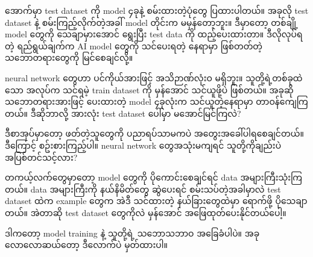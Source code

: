 အောက်မှာ test dataset ကို model ၄ခုနဲ့ စမ်းထားတဲ့ပုံတွေ ပြထားပါတယ်။
အခုလို test dataset နဲ့ စမ်းကြည့်လိုက်တဲ့အခါ် model တိုင်းက မမှန်တော့ဘူး။ ဒီမှာတော့ တစ်ချို့ model တွေကို
သေချာမှားအောင် ရွေးပြီး test data ကို ထည့်ပေးထားတာ။ ဒီလိုလုပ်ရတဲ့ ရည်ရွယ်ချက်က AI model တွေကို
သင်ပေးရတဲ့ နေရာမှာ ဖြစ်တတ်တဲ့ သဘောတရားတွေကို မြင်စေချင်လို့။

neural network တွေဟာ ပင်ကိုယ်အားဖြင့် အသိဉာဏ်လုံးဝ မရှိဘူး။ သူတို့ရဲ့တစ်ခုထဲသော အလုပ်က
သင်ရမဲ့ train dataset ကို မှန်အောင် သင်ယူဖို့ပဲ ဖြစ်တယ်။ အခုဆို သဘောတရားအားဖြင့် ပေးထားတဲ့ model 
၄ခုလုံးက သင်ယူတဲ့နေရာမှာ တာဝန်ကျေကြတယ်။ ဒီဆိုဘာလို့ အားလုံး test dataset ပေါ်မှာ မအောင်မြင်ကြလဲ?

ဒီစာအုပ်မှာတော့ ဖတ်တဲ့သူတွေကို ပညာရပ်သာမကပဲ အတွေးအခေါ်ပါရစေချင်တယ်။ ဒီကြောင့် စဥ်းစားကြည့်ပါ။
neural network တွေအသုံးမကျရင် သူတို့ကိုချည်းပဲ အပြစ်တင်သင့်လား?

တကယ့်လက်တွေမှာတော့ model တွေကို ပိုကောင်းစေချင်ရင် data အများကြီးသုံးကြတယ်။
data အများကြီးကို နယ်နိမိတ်တွေ ဆွဲပေးရင် စမ်းသပ်တဲ့အခါမှာလဲ test dataset ထဲက example တွေက
အဲဒီ သင်ထားတဲ့ နယ်ခြားတွေထဲမှာ ရောက်ဖို့ ပိုသေချာတယ်။ အဲတာဆို test dataset တွေကိုလဲ
မှန်အောင် အဖြေထုတ်ပေးနိုင်တယ်ပေါ့။

ဒါကတော့ model training နဲ့ သူတို့ရဲ့ သဘောသဘာဝ အခြေခံပါပဲ။ အခုလောလောဆယ်တော့ ဒီလောက်ပဲ မှတ်ထားပါ။

